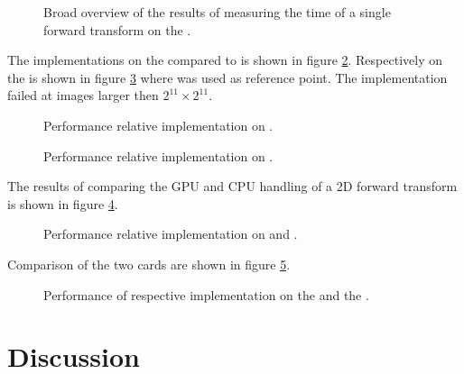\begin{figure}[\AllPlacementOptions]
	\centering
	
	\caption{Broad overview of the results of measuring the time of a single forward transform on the {\AMDCARD}.}
	\label{fig:r260x:overview-2d}
\end{figure}

The implementations on the {\NVCARD} compared to {\CU} is shown in figure \ref{fig:gtx:implementation-2d}. Respectively on the {\AMDCARD} is shown in figure \ref{fig:r260x:implementation-2d} where {\OCL} was used as reference point. The {\GL} implementation failed at images larger then $2^{11}{\times}2^{11}$.

\begin{figure}[\AllPlacementOptions]
	\centering
	
	\caption{Performance relative {\CU} implementation on {\NVCARD}.}
	\label{fig:gtx:implementation-2d}
\end{figure}

\begin{figure}[\AllPlacementOptions]
	\centering
	
	\caption{Performance relative {\OCL} implementation on {\AMDCARD}.}
	\label{fig:r260x:implementation-2d}
\end{figure}

The results of comparing the GPU and CPU handling of a 2D forward transform is shown in figure \ref{fig:gtx:cpu-2d}.

\begin{figure}[\AllPlacementOptions]
	\centering
	
	\caption{Performance relative {\CU} implementation on {\NVCARD} and {\INTELCPU}.}
	\label{fig:gtx:cpu-2d}
\end{figure}

Comparison of the two cards are shown in figure \ref{fig:gpu-comparison-2d}.

\begin{figure}[\AllPlacementOptions]
	\centering
	
	\caption{Performance of respective implementation on the {\AMDCARD} and the {\NVCARD}.}
	\label{fig:gpu-comparison-2d}
\end{figure}

\newpage

\section{Discussion}

